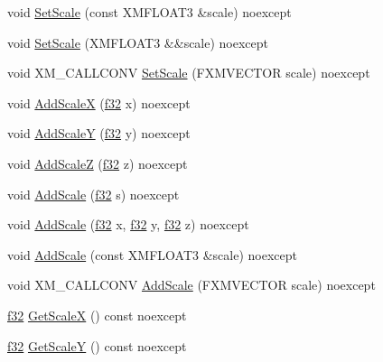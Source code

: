 \begin{DoxyCompactItemize}
\item 
void \hyperlink{structmage_1_1_transform_node_a135418b2bdc0ebdfb12cb747ece38d48}{Set\+Scale} (const X\+M\+F\+L\+O\+A\+T3 \&scale) noexcept
\item 
void \hyperlink{structmage_1_1_transform_node_aaaa992bbd1ebad4b858fcb28ce2781d0}{Set\+Scale} (X\+M\+F\+L\+O\+A\+T3 \&\&scale) noexcept
\item 
void X\+M\+\_\+\+C\+A\+L\+L\+C\+O\+NV \hyperlink{structmage_1_1_transform_node_ad90daae6725ce76c43429ef5ab90c2da}{Set\+Scale} (F\+X\+M\+V\+E\+C\+T\+OR scale) noexcept
\item 
void \hyperlink{structmage_1_1_transform_node_a517aa91abe1add130337c2e6ee8cbb6a}{Add\+ScaleX} (\hyperlink{namespacemage_a6a44ad388483959dc4dff9f2aef91431}{f32} x) noexcept
\item 
void \hyperlink{structmage_1_1_transform_node_acae345c8ecf3e21b800332afdfce9c73}{Add\+ScaleY} (\hyperlink{namespacemage_a6a44ad388483959dc4dff9f2aef91431}{f32} y) noexcept
\item 
void \hyperlink{structmage_1_1_transform_node_a0f0eb2af13b736e0e87aaaf1ae96e95c}{Add\+ScaleZ} (\hyperlink{namespacemage_a6a44ad388483959dc4dff9f2aef91431}{f32} z) noexcept
\item 
void \hyperlink{structmage_1_1_transform_node_a2ec8f54f469fc0aa4f11ad8d949f33be}{Add\+Scale} (\hyperlink{namespacemage_a6a44ad388483959dc4dff9f2aef91431}{f32} s) noexcept
\item 
void \hyperlink{structmage_1_1_transform_node_acaa3555428eb9a95e2d1227331aa39e9}{Add\+Scale} (\hyperlink{namespacemage_a6a44ad388483959dc4dff9f2aef91431}{f32} x, \hyperlink{namespacemage_a6a44ad388483959dc4dff9f2aef91431}{f32} y, \hyperlink{namespacemage_a6a44ad388483959dc4dff9f2aef91431}{f32} z) noexcept
\item 
void \hyperlink{structmage_1_1_transform_node_a7ae8445a7f447ae832efafdfc20c3add}{Add\+Scale} (const X\+M\+F\+L\+O\+A\+T3 \&scale) noexcept
\item 
void X\+M\+\_\+\+C\+A\+L\+L\+C\+O\+NV \hyperlink{structmage_1_1_transform_node_ae8d3002804b23e5f8fcf4bd092869819}{Add\+Scale} (F\+X\+M\+V\+E\+C\+T\+OR scale) noexcept
\item 
\hyperlink{namespacemage_a6a44ad388483959dc4dff9f2aef91431}{f32} \hyperlink{structmage_1_1_transform_node_a047c98891667092eb63ac58e115913bf}{Get\+ScaleX} () const noexcept
\item 
\hyperlink{namespacemage_a6a44ad388483959dc4dff9f2aef91431}{f32} \hyperlink{structmage_1_1_transform_node_a049116cba80659ac2356b4793ef3d1bc}{Get\+ScaleY} () const noexcept

\end{DoxyCompactItemize}
